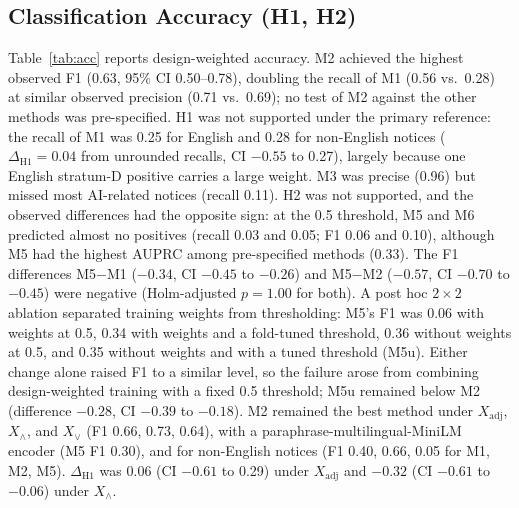 \documentclass[runningheads]{llncs}
\begin{document}
\subsection{Classification Accuracy (H1, H2)}
Table~\ref{tab:acc} reports design-weighted accuracy. M2 achieved the highest observed F1 (0.63, 95\% CI 0.50--0.78), doubling the recall of M1 (0.56 vs.\ 0.28) at similar observed precision (0.71 vs.\ 0.69); no test of M2 against the other methods was pre-specified. H1 was not supported under the primary reference: the recall of M1 was 0.25 for English and 0.28 for non-English notices ($\Delta_{\mathrm{H1}}=0.04$ from unrounded recalls, CI $-0.55$ to 0.27), largely because one English stratum-D positive carries a large weight. M3 was precise (0.96) but missed most AI-related notices (recall 0.11). H2 was not supported, and the observed differences had the opposite sign: at the 0.5 threshold, M5 and M6 predicted almost no positives (recall 0.03 and 0.05; F1 0.06 and 0.10), although M5 had the highest AUPRC among pre-specified methods (0.33). The F1 differences M5$-$M1 ($-0.34$, CI $-0.45$ to $-0.26$) and M5$-$M2 ($-0.57$, CI $-0.70$ to $-0.45$) were negative (Holm-adjusted $p=1.00$ for both). A post hoc $2\times2$ ablation separated training weights from thresholding: M5's F1 was 0.06 with weights at 0.5, 0.34 with weights and a fold-tuned threshold, 0.36 without weights at 0.5, and 0.35 without weights and with a tuned threshold (M5u). Either change alone raised F1 to a similar level, so the failure arose from combining design-weighted training with a fixed 0.5 threshold; M5u remained below M2 (difference $-0.28$, CI $-0.39$ to $-0.18$). M2 remained the best method under $X_{\mathrm{adj}}$, $X_\wedge$, and $X_\vee$ (F1 0.66, 0.73, 0.64), with a paraphrase-multilingual-MiniLM encoder (M5 F1 0.30), and for non-English notices (F1 0.40, 0.66, 0.05 for M1, M2, M5). $\Delta_{\mathrm{H1}}$ was 0.06 (CI $-0.61$ to 0.29) under $X_{\mathrm{adj}}$ and $-0.32$ (CI $-0.61$ to $-0.06$) under $X_\wedge$.
\end{document}
